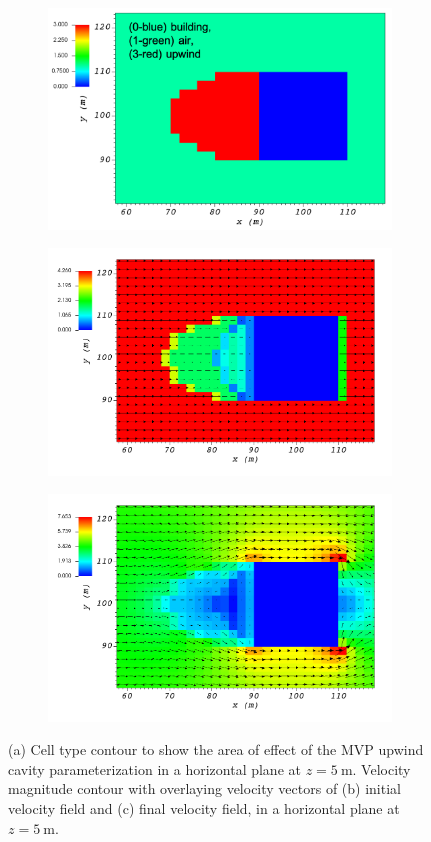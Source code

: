 \begin{figure}[H]
    \centering
    \begin{subfigure}{\textwidth}
    \centering
    \includegraphics[width=10.3cm,keepaspectratio]{Images/upwind_z_5_2_init_icell.png}
    \caption{}
    \end{subfigure}
    \begin{subfigure}{\textwidth}
    \centering
    \includegraphics[width=11.0cm,keepaspectratio]{Images/upwind_z_5_2_init_vel.png}
    \caption{}
    \end{subfigure}
    \begin{subfigure}{\textwidth}
    \centering
    \includegraphics[width=11.0cm,keepaspectratio]{Images/upwind_z_5_2_final.png}
    \caption{}
    \end{subfigure}
    \caption{(a) Cell type contour to show the area of effect of the MVP upwind cavity parameterization in a horizontal plane at $z=5\ \si{\meter}$. Velocity magnitude contour with overlaying velocity vectors of (b) initial velocity field and (c) final velocity field, in a horizontal plane at $z=5\ \si{\meter}$.}
\end{figure}

